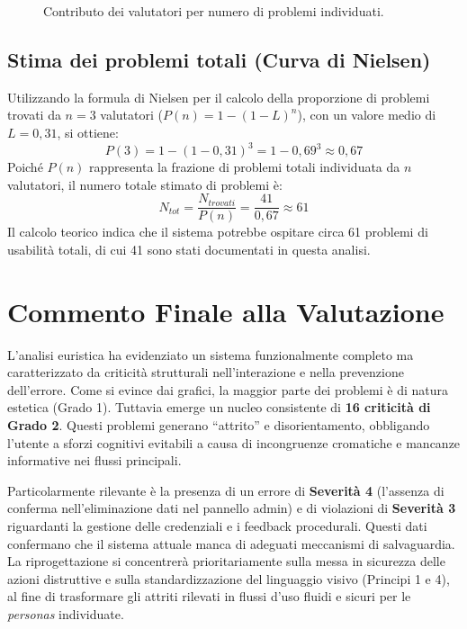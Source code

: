 \begin{figure}[H]
    \centering
    
    \caption{Contributo dei valutatori per numero di problemi individuati.}
    \label{fig:stat_valutatori}
\end{figure}


\subsection{Stima dei problemi totali (Curva di Nielsen)}
Utilizzando la formula di Nielsen per il calcolo della proporzione di problemi trovati da $n=3$ valutatori ($P(n) = 1 - (1 - L)^n$), con un valore medio di $L=0{,}31$, si ottiene:
\[ P(3) = 1 - (1 - 0{,}31)^3 = 1 - 0{,}69^3 \approx 0{,}67 \]
Poiché $P(n)$ rappresenta la frazione di problemi totali individuata da $n$ valutatori, il numero totale stimato di problemi è:
\[ N_{tot} = \frac{N_{trovati}}{P(n)} = \frac{41}{0{,}67} \approx 61 \]
Il calcolo teorico indica che il sistema potrebbe ospitare circa 61 problemi di usabilità totali, di cui 41 sono stati documentati in questa analisi.

\section{Commento Finale alla Valutazione}
L'analisi euristica ha evidenziato un sistema funzionalmente completo ma caratterizzato da criticità strutturali nell'interazione e nella prevenzione dell'errore. Come si evince dai grafici, la maggior parte dei problemi è di natura estetica (Grado 1). Tuttavia emerge un nucleo consistente di \textbf{16 criticità di Grado 2}. Questi problemi generano ``attrito'' e disorientamento, obbligando l'utente a sforzi cognitivi evitabili a causa di incongruenze cromatiche e mancanze informative nei flussi principali.

Particolarmente rilevante è la presenza di un errore di \textbf{Severità 4} (l'assenza di conferma nell'eliminazione dati nel pannello admin) e di violazioni di \textbf{Severità 3} riguardanti la gestione delle credenziali e i feedback procedurali. Questi dati confermano che il sistema attuale manca di adeguati meccanismi di salvaguardia. La riprogettazione si concentrerà prioritariamente sulla messa in sicurezza delle azioni distruttive e sulla standardizzazione del linguaggio visivo (Principi 1 e 4), al fine di trasformare gli attriti rilevati in flussi d'uso fluidi e sicuri per le \textit{personas} individuate.
